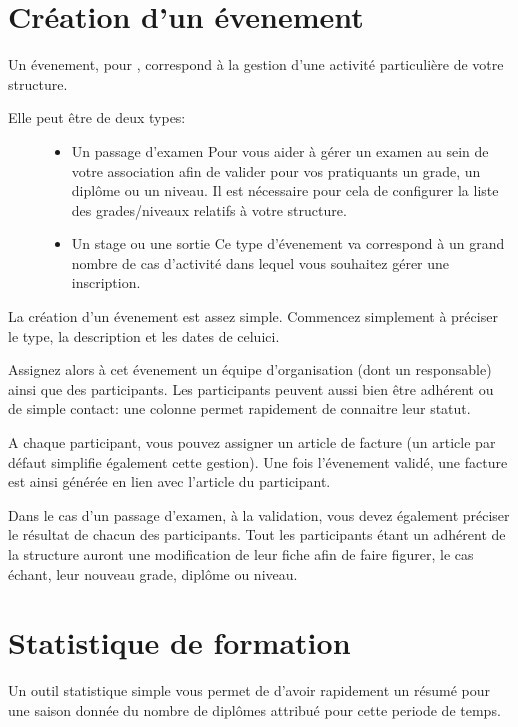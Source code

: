 \documentclass[a4paper,10pt,oneside,french]{sphinxmanual}
\begin{document}
\section{Création d’un évenement}
\label{\detokenize{event/newevent:creation-d-un-evenement}}\label{\detokenize{event/newevent::doc}}
\sphinxAtStartPar
Un évenement, pour , correspond à la gestion d’une activité particulière de votre structure.
\begin{description}
\item[{Elle peut être de deux types:}] \leavevmode\begin{itemize}
\item {} 
\sphinxAtStartPar
Un passage d’examen
Pour vous aider à gérer un examen au sein de votre association afin de valider pour vos pratiquants un grade, un diplôme ou un niveau.
Il est nécessaire pour cela de configurer la liste des grades/niveaux relatifs à votre structure.

\item {} 
\sphinxAtStartPar
Un stage ou une sortie
Ce type d’évenement va correspond à un grand nombre de cas d’activité dans lequel vous souhaitez gérer une inscription.

\end{itemize}

\end{description}

\sphinxAtStartPar
La création d’un évenement est assez simple.
Commencez simplement à préciser le type, la description et les dates de celui\sphinxhyphen{}ci.

\sphinxAtStartPar
Assignez alors à cet évenement un équipe d’organisation (dont un responsable) ainsi que des participants.
Les participants peuvent aussi bien être adhérent ou de simple contact: une colonne permet rapidement de connaitre leur statut.

\sphinxAtStartPar
A chaque participant, vous pouvez assigner un article de facture (un article par défaut simplifie également cette gestion).
Une fois l’évenement validé, une facture est ainsi générée en lien avec l’article du participant.

\sphinxAtStartPar
Dans le cas d’un passage d’examen, à la validation, vous devez également préciser le résultat de chacun des participants.
Tout les participants étant un adhérent de la structure auront une modification de leur fiche afin de faire figurer, le cas échant, leur nouveau grade, diplôme ou niveau.


\section{Statistique de formation}
\label{\detokenize{event/statistic:statistique-de-formation}}\label{\detokenize{event/statistic::doc}}
\sphinxAtStartPar
Un outil statistique simple vous permet de d’avoir rapidement un résumé pour une saison donnée du nombre de diplômes attribué pour cette periode de temps.
\end{document}
